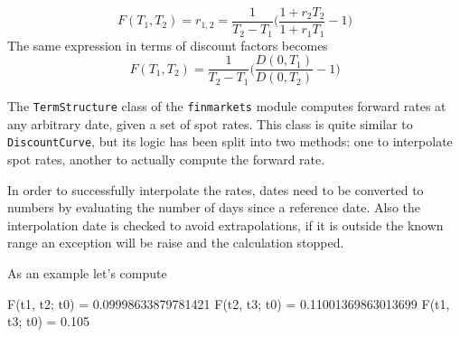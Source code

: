 \begin{equation}
F(T_1, T_2) = r_{1,2} = \frac{1}{T_2 - T_1}\Big(\frac{1+r_2 T_2}{1+r_1 T_1} - 1 \Big)
\label{eq:forward_rate_simple}
\end{equation}
The same expression in terms of discount factors becomes
\begin{equation}
F(T_1, T_2) = \frac{1}{T_2 - T_1}\Big(\frac{D(0, T_1)}{D(0, T_2)} - 1 \Big)
\end{equation}

\begin{finmarkets}
The \texttt{TermStructure} class of the \texttt{finmarkets} module computes forward rates at any arbitrary date, given a set of spot rates. This class is quite similar to \texttt{DiscountCurve}, but its logic has been split into two methods: one to interpolate spot rates, another to actually compute the forward rate.

In order to successfully interpolate the rates, dates need to be converted to numbers by evaluating the number of days since a reference date. Also the interpolation date is checked to avoid extrapolations, if it is outside the known range an exception will be raise and the calculation stopped.
\end{finmarkets}

\noindent
As an example let's compute


\begin{ioutput}
F(t1, t2; t0) = 0.09998633879781421
F(t2, t3; t0) = 0.11001369863013699
F(t1, t3; t0) = 0.105
\end{ioutput}

